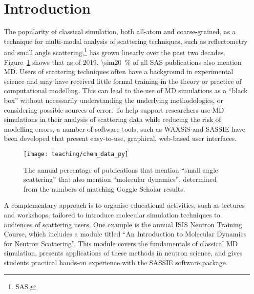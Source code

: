 \section{Introduction}
The popularity of classical simulation, both all-atom and coarse-grained, as a technique for multi-modal analysis of scattering techniques, such as reflectometry and small angle scattering,\footnote{SAS.} has grown linearly over the past two decades.
Figure~\ref{fig:growth} shows that as of 2019, \SI{\sim20}{\percent} of all SAS publications also mention MD.
Users of scattering techniques often have a background in experimental science and may have received little formal training in the theory or practice of computational modelling.
This can lead to the use of MD simulations as a ``black box'' without necessarily understanding the underlying methodologies, or considering possible sources of error.
To help support researchers use MD simulations in their analysis of scattering data while reducing the risk of modelling errors, a number of software tools, such as WAXSiS and SASSIE have been developed that present easy-to-use, graphical, web-based user interfaces.
%
\begin{figure}[t]
    \centering
    \texttt{[image: teaching/chem\_data\_py]}
    \caption{The annual percentage of publications that mention ``small angle scattering'' that also mention ``molecular dynamics'', determined from the numbers of matching Goggle Scholar results.}
    \label{fig:growth}
\end{figure}
%

A complementary approach is to organise educational activities, such as lectures and workshops, tailored to introduce molecular simulation techniques to audiences of scattering users.
One example is the annual ISIS Neutron Training Course, which includes a module titled ``An Introduction to Molecular Dynamics for Neutron Scattering''.
This module covers the fundamentals of classical MD simulation, presents applications of these methods in neutron science, and gives students practical hands-on experience with the SASSIE software package.

